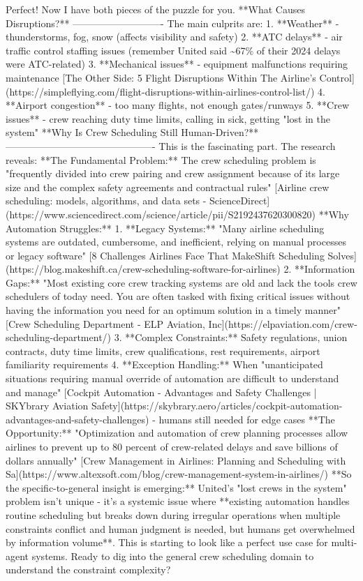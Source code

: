\begin{botresponse}
Perfect! Now I have both pieces of the puzzle for you.
**What Causes Disruptions?**
----------------------------
The main culprits are:
1.  **Weather** - thunderstorms, fog, snow (affects visibility and safety)
2.  **ATC delays** - air traffic control staffing issues (remember United said \textasciitilde{}67\% of their 2024 delays were ATC-related)
3.  **Mechanical issues** - equipment malfunctions requiring maintenance [The Other Side: 5 Flight Disruptions Within The Airline’s Control](https://simpleflying.com/flight-disruptions-within-airlines-control-list/)
4.  **Airport congestion** - too many flights, not enough gates/runways
5.  **Crew issues** - crew reaching duty time limits, calling in sick, getting "lost in the system"
**Why Is Crew Scheduling Still Human-Driven?**
----------------------------------------------
This is the fascinating part. The research reveals:
**The Fundamental Problem:** The crew scheduling problem is "frequently divided into crew pairing and crew assignment because of its large size and the complex safety agreements and contractual rules" [Airline crew scheduling: models, algorithms, and data sets - ScienceDirect](https://www.sciencedirect.com/science/article/pii/S2192437620300820)
**Why Automation Struggles:**
1.  **Legacy Systems:** "Many airline scheduling systems are outdated, cumbersome, and inefficient, relying on manual processes or legacy software" [8 Challenges Airlines Face That MakeShift Scheduling Solves](https://blog.makeshift.ca/crew-scheduling-software-for-airlines)
2.  **Information Gaps:** "Most existing core crew tracking systems are old and lack the tools crew schedulers of today need. You are often tasked with fixing critical issues without having the information you need for an optimum solution in a timely manner" [Crew Scheduling Department - ELP Aviation, Inc](https://elpaviation.com/crew-scheduling-department/)
3.  **Complex Constraints:** Safety regulations, union contracts, duty time limits, crew qualifications, rest requirements, airport familiarity requirements
4.  **Exception Handling:** When "unanticipated situations requiring manual override of automation are difficult to understand and manage" [Cockpit Automation - Advantages and Safety Challenges | SKYbrary Aviation Safety](https://skybrary.aero/articles/cockpit-automation-advantages-and-safety-challenges) - humans still needed for edge cases
**The Opportunity:** "Optimization and automation of crew planning processes allow airlines to prevent up to 80 percent of crew-related delays and save billions of dollars annually" [Crew Management in Airlines: Planning and Scheduling with Sa](https://www.altexsoft.com/blog/crew-management-system-in-airlines/)
**So the specific-to-general insight is emerging:** United's "lost crews in the system" problem isn't unique - it's a systemic issue where **existing automation handles routine scheduling but breaks down during irregular operations when multiple constraints conflict and human judgment is needed, but humans get overwhelmed by information volume**.
This is starting to look like a perfect use case for multi-agent systems. Ready to dig into the general crew scheduling domain to understand the constraint complexity?
\end{botresponse}

